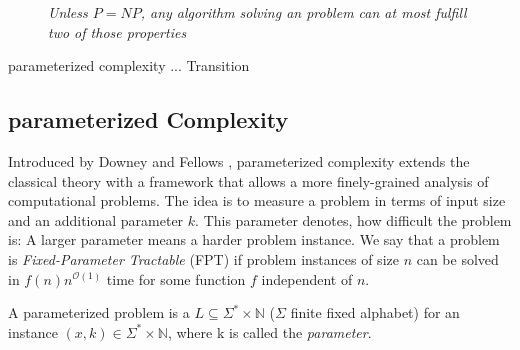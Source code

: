 





\begin{figure}
    \centering
{}
    \caption{\textit{Unless $P = NP$, any algorithm solving an \NPc problem can at most fulfill two of those properties}}
    \label{fig:npc}
\end{figure}

parameterized complexity ... Transition

\subsection{parameterized Complexity}

Introduced by Downey and Fellows \cite{Downey1999a}, parameterized complexity extends the classical theory with a framework that allows a more finely-grained analysis of computational problems. The idea is to measure a problem in terms of input size and an additional parameter $k$. This parameter denotes, how difficult the problem is: A larger parameter means a harder problem instance. We say that a problem is \textit{Fixed-Parameter Tractable} (FPT) if problem instances of size $n$ can be solved in $f(n)n^{\mathcal{O}(1)}$ time for some function $f$ independent of $n$. 


\begin{definition}
    A parameterized problem is a $L\subseteq\Sigma^*\times \mathbb{N}$ ($\Sigma$ finite fixed alphabet) for an instance $(x,k)\in \Sigma^*\times \mathbb{N}$, where k is called the \textit{parameter}.
\end{definition}

